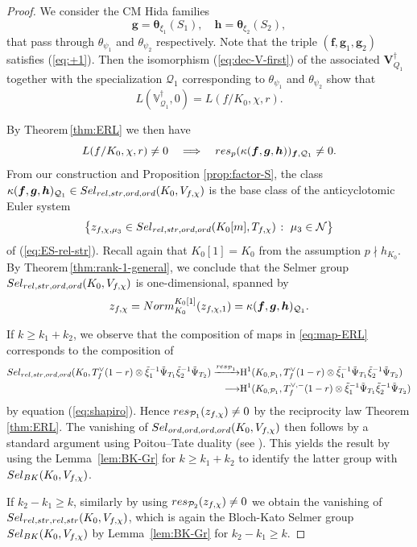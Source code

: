 \documentclass[10pt,letterpaper]{amsart}
\theoremstyle{plain}
\theoremstyle{definition}
\theoremstyle{definition}
\theoremstyle{plain}
\theoremstyle{plain}
\theoremstyle{plain}
\theoremstyle{remark}
\numberwithin{equation}{section}
\newcommand{\cc}{\mathbf{c}}
\newcommand{\ch}{\xi}
\newcommand{\rH}{{\mathrm{H}}}
\newcommand{\relstr}{{{\rm rel},{\rm str}}}
\newcommand{\ord}{{{\rm ord},{\rm ord}}}
\newcommand{\Vsdag}{{\mathbf{V}_{Q_1}^\dagger}}
\newcommand{\bff}{{\boldsymbol{f}}}
\newcommand{\bfg}{{\boldsymbol{g}}}
\newcommand{\bfh}{{\boldsymbol{h}}}
\begin{document}
\begin{proof}
We consider the CM Hida families
\[
\bfg=\boldsymbol{\theta}_{\ch_1}(S_1),\quad\bfh=\boldsymbol{\theta}_{\ch_2}(S_2),
\]
that pass through $\theta_{\psi_1}$ and $\theta_{\psi_2}$ respectively. Note that the triple $(\bff,\bfg_1,\bfg_2)$ satisfies (\ref{eq:+1}). Then the isomorphism (\ref{eq:dec-V-first}) of the associated $\Vsdag$ together with the specialization ${\mathcal{Q}_1}$ corresponding to $\theta_{\psi_1}$ and $\theta_{\psi_2}$ show that
\[
L(\mathbb{V}_{\mathcal{Q}_1}^\dag,0)=L(f/K_0,\chi,r).
\]

By Theorem\,\ref{thm:ERL} we then have
\[
L(f/K_0,\chi,r)\neq 0\quad\Longrightarrow\quad{\rm res}_p(\kappa(\bff,\bfg,\bfh))_{\bff,{\mathcal{Q}_1}}\neq 0.
\]
From our construction and Proposition \ref{prop:factor-S}, the class $\kappa(\bff,\bfg,\bfh)_{\mathcal{Q}_1}\in{\rm Sel}_{\relstr,\ord}(K_0,V_{f,\chi})$ is the base class of the anticyclotomic Euler system 
\[
\bigl\{z_{f,\chi,\mu_3}\in{\rm Sel}_{\relstr,\ord}(K_0[m],T_{f,\chi})\;\colon\;\mu_3\in\mathcal{N}\bigr\}
\]
of (\ref{eq:ES-rel-str}). Recall again that $K_0[1]=K_0$ from the assumption $p \nmid h_{K_0}$. By Theorem\,\ref{thm:rank-1-general}, we conclude that the Selmer group ${\rm Sel}_{\relstr,\ord}(K_0,V_{f,\chi})$ is one-dimensional, 
spanned by 
\[
z_{f,\chi}={\rm Norm}^{K_0[1]}_{K_0}(z_{f,\chi,1})=\kappa(\bff,\bfg,\bfh)_{\mathcal{Q}_1}.
\]  


If $k\ge k_1+k_2$, we observe that the composition of maps in \ref{eq:map-ERL} corresponds to the composition of
\begin{align*}
    {\rm Sel}_{\relstr,\ord}(K_0,T_f^{\vee}(1-r)\otimes\tilde{\ch}_1^{-1}\tilde{\Psi}_{T_1}\tilde{\ch}_2^{-1}\tilde{\Psi}_{T_2}) \xrightarrow{{\rm res}_{\mathcal{P}_1}} &\rH^1(K_{0,\mathcal{P}_1},T_f^{\vee}(1-r)\otimes\tilde{\ch}_1^{-1}\tilde{\Psi}_{T_1}\tilde{\ch}_2^{-1}\tilde{\Psi}_{T_2})\\
    \longrightarrow &\rH^1(K_{0,\mathcal{P}_1},T_f^{\vee,-}(1-r)\otimes\tilde{\ch}_1^{-1}\tilde{\Psi}_{T_1}\tilde{\ch}_2^{-1}\tilde{\Psi}_{T_2})
\end{align*}
by equation (\ref{eq:shapiro}). Hence ${\rm res}_{\mathcal{P}_1}(z_{f,\chi})\neq 0$ by the reciprocity law Theorem \ref{thm:ERL}. The vanishing of ${\rm Sel}_{\ord,\ord}(K_0,V_{f,\chi})$ then follows by a standard argument using Poitou--Tate duality (see \cite[\S{5.1.1}]{Do-PhD}). This yields the result by using the Lemma~\ref{lem:BK-Gr} for $k\ge k_1+k_2$ to identify the latter group with ${\rm Sel}_{\rm BK}(K_0,V_{f,\chi})$.

If $k_2-k_1\ge k$, similarly by using ${\rm res}_{\mathcal{P}_2}(z_{f,\chi})\neq 0$ we obtain the vanishing of ${\rm Sel}_{\relstr,\relstr}(K_0,V_{f,\chi})$, which is again the Bloch-Kato Selmer group ${\rm Sel}_{\rm BK}(K_0,V_{f,\chi})$ by Lemma~\ref{lem:BK-Gr} for $k_2-k_1\ge k$.
\end{proof}
\end{document}
